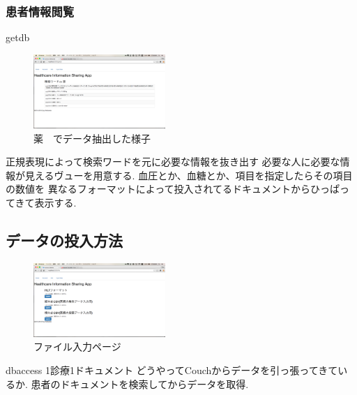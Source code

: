 	\subsubsection{患者情報閲覧}
		getdb
		\\
		\begin{figure}[htbp]
				\includegraphics[width=5cm, bb=0 0 437 688]{./gazou/getdb.png}
			\caption{薬　でデータ抽出した様子}
			\label{ss-mix_sampledata}
		\end{figure}
		正規表現によって検索ワードを元に必要な情報を抜き出す
		必要な人に必要な情報が見えるヴューを用意する.
		血圧とか、血糖とか、項目を指定したらその項目の数値を
		異なるフォーマットによって投入されてるドキュメントからひっぱってきて表示する.



\subsection{データの投入方法}

	\begin{figure}[htbp]
		\begin{center}
			\includegraphics[width=5cm, bb=0 0 437 688]{./gazou/fileiopage.png}
		\end{center}
		\caption{ファイル入力ページ}
		\label{ss-mix_sampledata}
	\end{figure}

	dbaccess
	1診療1ドキュメント
	どうやってCouchからデータを引っ張ってきているか.
	患者のドキュメントを検索してからデータを取得.
